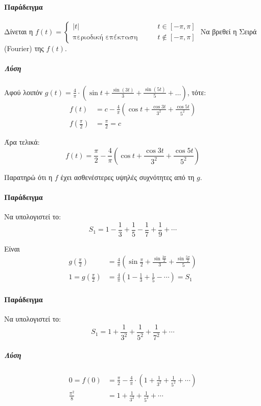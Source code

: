 \documentclass[11pt,a4paper,titlepage,final]{article}
\begin{document}
\paragraph{Παράδειγμα}
Δίνεται η \(f(t)
= \begin{cases}
|t| &\qquad t \in [-\pi,\pi] \\
\text{περιοδική επέκταση} &\qquad t \notin [-\pi,\pi]
\end{cases}
\)
Να βρεθεί η Σειρά (\textlatin{Fourier}) της \(f(t)\).
\subparagraph{Λύση}
Αφού λοιπόν \(g(t)=
\frac{4}{\pi} \cdot
\left(
\sin t + \frac{\sin(3t)}{3} + \frac{\sin(5t)}{5} + \dots
\right)
\), τότε:
\begin{align*}
f(t) &=
c - \frac{4}{\pi}
\left(
\cos t + \frac{\cos 3t}{3^2}
+ \frac{\cos 5t}{5^2}
\right)
\\ f\left(\frac{\pi}{2}\right) &= \frac{\pi}{2} = c
\end{align*}

Άρα τελικά:
\[
f(t) = \frac{\pi}{2} - \frac{4}{\pi}
\left(
\cos t + \frac{\cos 3t}{3^2}
+ \frac{\cos 5t}{5^2}
\right)
\]

Παρατηρώ ότι η \(f\) έχει ασθενέστερες υψηλές συχνότητες από τη \(g\).

\paragraph{Παράδειγμα}
Να υπολογιστεί το:
\[
S_1 = 1 - \frac{1}{3} + \frac{1}{5} - \frac{1}{7} + \frac{1}{9} + \cdots
\]

Είναι \begin{align*}
g\left( \frac{\pi}{2}\right) &=
\frac{4}{\pi}\left(
\sin \frac{\pi}{2}+\frac{\sin\frac{3\pi}{2}}{3}
+ \frac{\sin\frac{5\pi}{2}}{5}
\right)
\\ 
1 = g\left( \frac{\pi}{2}\right) &= \frac{4}{\pi}
\left(
1-\frac{1}{3}+\frac{1}{5}-\cdots
\right) = S_1
\end{align*}

\paragraph{Παράδειγμα}
Να υπολογιστεί το:
\[
S_1 = 1 + \frac{1}{3^2} + \frac{1}{5^2} + \frac{1}{7^2} + \cdots
\]
\subparagraph{Λύση}
\begin{align*}
0=f(0)&=\frac{\pi}{2} - \frac{4}{\pi} \cdot\left(
1+\frac{1}{3^2}+\frac{1}{5^2}+\cdots
\right)
\\ \frac{\pi^2}{8} &= 1 + \frac{1}{3^2} + \frac{1}{5^2} + \cdots
\end{align*}
\end{document}
